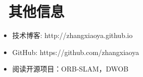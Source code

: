 \documentclass{resume}
\begin{document}

\section{\faInfo\ 其他信息}
\begin{itemize}[parsep=0.5ex]
  \item 技术博客: http://zhangxiaoya.github.io
  \item GitHub: https://github.com/zhangxiaoya
  \item 阅读开源项目：ORB-SLAM，DWOB
\end{itemize}
\end{document}
